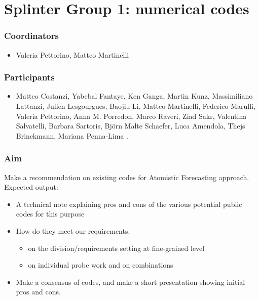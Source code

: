 



%

\section{Splinter Group 1: numerical codes}

\subsubsection*{Coordinators}
\begin{itemize}
 \item Valeria Pettorino, Matteo Martinelli
\end{itemize}
\subsubsection*{Participants}
\begin{itemize}
 \item Matteo Costanzi,  Yabebal Fantaye, Ken Ganga, Martin Kunz, Massimiliano Lattanzi, Julien Lesgourgues, Baojiu Li, Matteo Martinelli, Federico Marulli, Valeria Pettorino, Anna M. Porredon, Marco Raveri, Ziad Sakr, Valentina Salvatelli, Barbara Sartoris, Bj\"orn Malte Schaefer, Luca Amendola, Thejs Brinckmann, Mariana Penna-Lima .
\end{itemize}

\subsubsection*{Aim}
Make a recommendation on existing codes for Atomistic Forecasting approach.\\
Expected output:
\begin{itemize}
 \item A technical note explaining pros and cons of the various potential public codes for this purpose 
 \item How do they meet our requirements:
 \begin{itemize}
  \item on the division/requirements setting at fine-grained level 
  \item on individual probe work and on combinations
 \end{itemize}
 \item Make a consensus of codes, and make a short presentation showing initial pros and cons.
\end{itemize}

